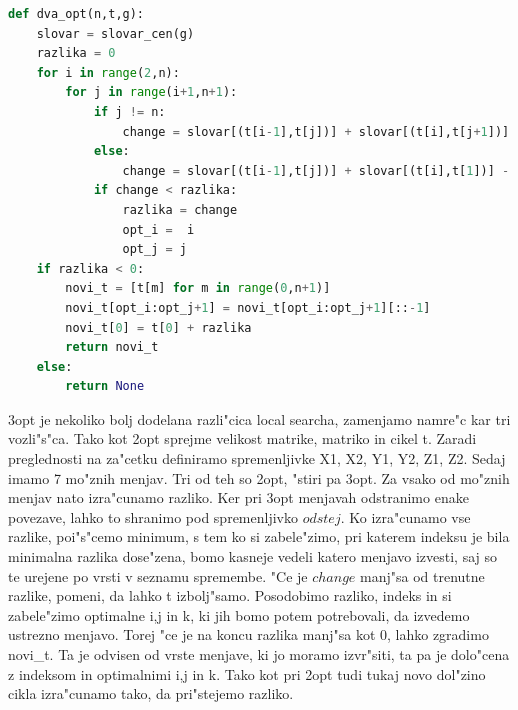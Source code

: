 \documentclass[12pt,a4paper]{amsart}
\theoremstyle{definition} %
\theoremstyle{plain} %
\begin{document}
\begin{lstlisting}[language=Python]
def dva_opt(n,t,g):
    slovar = slovar_cen(g)
    razlika = 0
    for i in range(2,n):
        for j in range(i+1,n+1):
            if j != n:
                change = slovar[(t[i-1],t[j])] + slovar[(t[i],t[j+1])] - slovar[(t[i-1],t[i])] - slovar[(t[j],t[j+1])]
            else:
                change = slovar[(t[i-1],t[j])] + slovar[(t[i],t[1])] - slovar[(t[i-1],t[i])] - slovar[(t[j],t[1])]               
            if change < razlika:
                razlika = change
                opt_i =  i
                opt_j = j
    if razlika < 0:
        novi_t = [t[m] for m in range(0,n+1)]
        novi_t[opt_i:opt_j+1] = novi_t[opt_i:opt_j+1][::-1]
        novi_t[0] = t[0] + razlika        
        return novi_t
    else:
        return None
\end{lstlisting}

3opt je nekoliko bolj dodelana razli"cica local searcha, zamenjamo namre"c kar tri vozli"s"ca. Tako kot 2opt sprejme velikost matrike, 
matriko in cikel t. Zaradi preglednosti na za"cetku definiramo spremenljivke X1, X2, Y1, Y2, Z1, Z2. Sedaj imamo 7 mo"znih menjav. Tri od teh so 2opt, "stiri pa 3opt. Za vsako od mo"znih menjav nato izra"cunamo razliko. Ker pri 3opt menjavah odstranimo enake povezave, lahko to shranimo pod spremenljivko $odstej$. Ko izra"cunamo vse razlike, poi"s"cemo minimum, s tem ko si zabele"zimo, pri katerem indeksu je bila minimalna razlika dose"zena, bomo kasneje vedeli katero menjavo izvesti, saj so te urejene po vrsti v seznamu spremembe. "Ce je $change$ manj"sa od trenutne razlike, pomeni, da lahko t izbolj"samo. Posodobimo razliko, indeks in si zabele"zimo optimalne i,j in k, ki jih bomo potem potrebovali, da izvedemo ustrezno menjavo. Torej "ce je na koncu razlika manj"sa kot 0, lahko zgradimo novi\_t. Ta je odvisen od vrste menjave, ki jo moramo izvr"siti, ta pa je dolo"cena z indeksom in optimalnimi i,j in k. Tako kot pri 2opt tudi tukaj novo dol"zino cikla izra"cunamo tako, da pri"stejemo razliko. 
\end{document}

